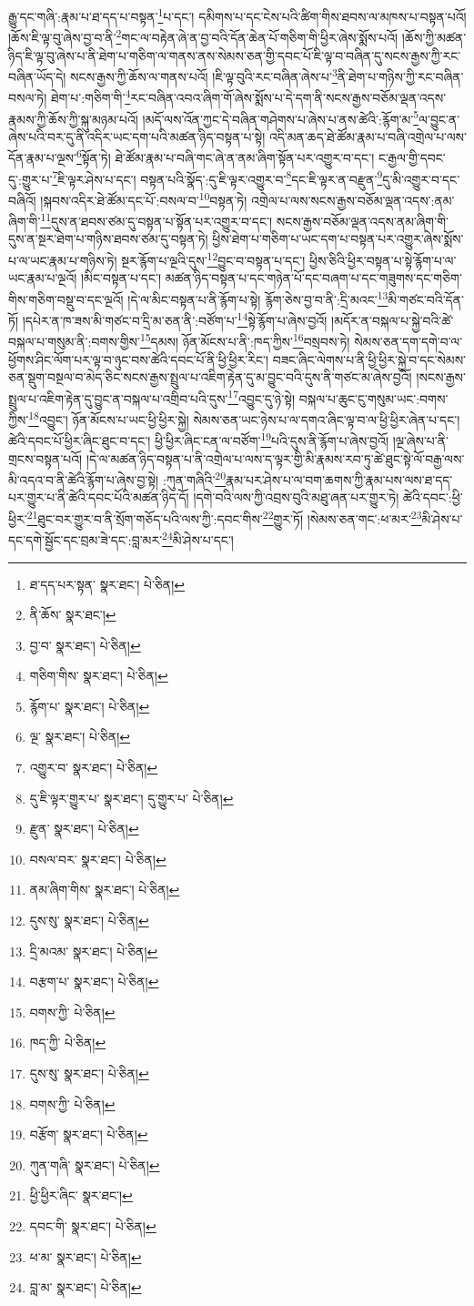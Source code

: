 རྒྱུ་དང་གཞི་:རྣམ་པ་ཐ་དད་པ་བསྟན་\footnote{ཐ་དད་པར་སྟན་  སྣར་ཐང་།  པེ་ཅིན། }པ་དང་། དམིགས་པ་དང་ངེས་པའི་ཚིག་གིས་ཐབས་ལ་མཁས་པ་བསྟན་པའོ། །ཆོས་ཇི་ལྟ་བུ་ཞེས་བྱ་བ་ནི་\footnote{ནི་ཆོས་  སྣར་ཐང་། }གང་ལ་བརྟེན་ཞེ་ན་བྱ་བའི་དོན་ཆེན་པོ་གཅིག་གི་ཕྱིར་ཞེས་སྨོས་པའོ། །ཆོས་ཀྱི་མཚན་ཉིད་ཇི་ལྟ་བུ་ཞེས་པ་ནི་ཐེག་པ་གཅིག་ལ་གནས་ནས་སེམས་ཅན་གྱི་དབང་པོ་ཇི་ལྟ་བ་བཞིན་དུ་སངས་རྒྱས་ཀྱི་རང་བཞིན་ཡོད་དེ། སངས་རྒྱས་ཀྱི་ཆོས་ལ་གནས་པའོ། །ཇི་ལྟ་བུའི་རང་བཞིན་ཞེས་པ་\footnote{བྱ་བ་  སྣར་ཐང་།  པེ་ཅིན། }ནི་ཐེག་པ་གཉིས་ཀྱི་རང་བཞིན་བསལ་ཏེ། ཐེག་པ་:གཅིག་གི་\footnote{གཅིག་གིས་  སྣར་ཐང་།  པེ་ཅིན། }རང་བཞིན་འབའ་ཞིག་གོ་ཞེས་སྨོས་པ་དེ་དག་ནི་སངས་རྒྱས་བཅོམ་ལྡན་འདས་རྣམས་ཀྱི་ཆོས་ཀྱི་སྐུ་མཉམ་པའོ། །མདོ་ལས་འོན་ཀྱང་དེ་བཞིན་གཤེགས་པ་ཞེས་པ་ནས་ཚེའི་:རྙོག་མ་\footnote{རྙོག་པ་  སྣར་ཐང་།  པེ་ཅིན། }ལ་བྱུང་ན་ཞེས་པའི་བར་དུ་ནི་འདིར་ཡང་དག་པའི་མཚན་ཉིད་བསྟན་པ་སྟེ། འདི་མན་ཆད་ཐེ་ཚོམ་རྣམ་པ་བཞི་འགྲེལ་པ་ལས་དོན་རྣམ་པ་ལྔས་\footnote{ལྔ་  སྣར་ཐང་།  པེ་ཅིན། }སྟོན་ཏེ། ཐེ་ཚོམ་རྣམ་པ་བཞི་གང་ཞེ་ན་ནམ་ཞིག་སྟོན་པར་འགྱུར་བ་དང་། ང་རྒྱལ་གྱི་དབང་དུ་:གྱུར་པ་\footnote{འགྱུར་བ་  སྣར་ཐང་།  པེ་ཅིན། }ཇི་ལྟར་ཤེས་པ་དང་། བསྟན་པའི་སྣོད་:དུ་ཇི་ལྟར་འགྱུར་བ་\footnote{དུ་ཇི་ལྟར་གྱུར་པ་  སྣར་ཐང་། དུ་གྱུར་པ་  པེ་ཅིན། }དང་ཇི་ལྟར་ན་བརྫུན་\footnote{རྫུན་  སྣར་ཐང་།  པེ་ཅིན། }དུ་མི་འགྱུར་བ་དང་བཞིའོ། །སྐབས་འདིར་ཐེ་ཚོམ་དང་པོ་:བསལ་བ་\footnote{བསལ་བར་  སྣར་ཐང་།  པེ་ཅིན། }བསྟན་ཏེ། འགྲེལ་པ་ལས་སངས་རྒྱས་བཅོམ་ལྡན་འདས་:ནམ་ཞིག་གི་\footnote{ནམ་ཞིག་གིས་  སྣར་ཐང་།  པེ་ཅིན། }དུས་ན་ཐབས་ཙམ་དུ་བསྟན་པ་སྟོན་པར་འགྱུར་བ་དང་། སངས་རྒྱས་བཅོམ་ལྡན་འདས་ནམ་ཞིག་གི་དུས་ན་སྔར་ཐེག་པ་གཉིས་ཐབས་ཙམ་དུ་བསྟན་ཏེ། ཕྱིས་ཐེག་པ་གཅིག་པ་ཡང་དག་པ་བསྟན་པར་འགྱུར་ཞེས་སྨོས་པ་ལ་ཡང་རྣམ་པ་གཉིས་ཏེ། སྔར་རྙོག་པ་ལྔའི་དུས་\footnote{དུས་སུ་  སྣར་ཐང་།  པེ་ཅིན། }བྱུང་བ་བསྟན་པ་དང་། ཕྱིས་ཅིའི་ཕྱིར་བསྟན་པ་སྟེ་རྙོག་པ་ལ་ཡང་རྣམ་པ་ལྔའོ། །མིང་བསྟན་པ་དང་། མཚན་ཉིད་བསྟན་པ་དང་གཉེན་པོ་དང་བཞག་པ་དང་གཟུགས་དང་གཅིག་གིས་གཅིག་བསྡུ་བ་དང་ལྔའོ། །དེ་ལ་མིང་བསྟན་པ་ནི་རྙོག་པ་སྟེ། རྙོག་ཅེས་བྱ་བ་ནི་:དྲི་མའང་\footnote{དྲི་མའམ་  སྣར་ཐང་།  པེ་ཅིན། }མི་གཙང་བའི་དོན་ཏོ། །དཔེར་ན་ཁ་ཟས་མི་གཙང་བ་དྲི་མ་ཅན་ནི་:བཙོག་པ་\footnote{བརྩག་པ་  སྣར་ཐང་།  པེ་ཅིན། }སྟེ་རྙོག་པ་ཞེས་བྱའོ། །མདོར་ན་བསྐལ་པ་སྐྱེ་བའི་ཚེ་བསྐལ་པ་གསུམ་ནི་:བགས་གྱིས་\footnote{བགས་ཀྱི་  པེ་ཅིན། }དམས། ཉོན་མོངས་པ་ནི་:ཁད་ཀྱིས་\footnote{ཁད་ཀྱི་  པེ་ཅིན། }བསྲབས་ཏེ། སེམས་ཅན་དག་དགེ་བ་ལ་ཕྱོགས་ཤིང་ལོག་པར་ལྟ་བ་ཉུང་བས་ཚེའི་དབང་པོ་ནི་ཕྱི་ཕྱིར་རིང་། བཟང་ཞིང་ལེགས་པ་ནི་ཕྱི་ཕྱིར་སྐྱེ་བ་དང་སེམས་ཅན་སྡུག་བསྔལ་བ་མེད་ཅིང་སངས་རྒྱས་སྤྲུལ་པ་འཇིག་རྟེན་དུ་མ་བྱུང་བའི་དུས་ནི་གཙང་མ་ཞེས་བྱའོ། །སངས་རྒྱས་སྤྲུལ་པ་འཇིག་རྟེན་དུ་བྱུང་ན་བསྐལ་པ་འགྲིབ་པའི་དུས་\footnote{དུས་སུ་  སྣར་ཐང་།  པེ་ཅིན། }འབྱུང་དུ་ཉེ་སྟེ། བསྐལ་པ་ཆུང་ངུ་གསུམ་ཡང་:བགས་ཀྱིས་\footnote{བགས་ཀྱི་  པེ་ཅིན། }འབྱུང་། ཉོན་མོངས་པ་ཡང་ཕྱི་ཕྱིར་སྐྱེ། སེམས་ཅན་ཡང་ཉེས་པ་ལ་དགའ་ཞིང་ལྟ་བ་ལ་ཕྱི་ཕྱིར་ཞེན་པ་དང་། ཚེའི་དབང་པོ་ཕྱིར་ཞིང་ཐུང་བ་དང་། ཕྱི་ཕྱིར་ཞིང་ངན་ལ་བཙོག་\footnote{བརྩོག་  སྣར་ཐང་།  པེ་ཅིན། }པའི་དུས་ནི་རྙོག་པ་ཞེས་བྱའོ། །ལྔ་ཞེས་པ་ནི་གྲངས་བསྟན་པའོ། །དེ་ལ་མཚན་ཉིད་བསྟན་པ་ནི་འགྲེལ་པ་ལས་ད་ལྟར་གྱི་མི་རྣམས་རབ་ཏུ་ཚེ་ཐུང་སྟེ་ལོ་བརྒྱ་ལས་མི་འདའ་བ་ནི་ཚེའི་རྙོག་པ་ཞེས་བྱ་སྟེ། :ཀུན་གཞིའི་\footnote{ཀུན་གཞི་  སྣར་ཐང་།  པེ་ཅིན། }རྣམ་པར་ཤེས་པ་ལ་བག་ཆགས་ཀྱི་རྣམ་པས་ལས་ཐ་དད་པར་གྱུར་པ་ནི་ཚེའི་དབང་པོའི་མཚན་ཉིད་དོ། །དགེ་བའི་ལས་ཀྱི་འབྲས་བུའི་མཐུ་ཞན་པར་གྱུར་ཏེ། ཚེའི་དབང་:ཕྱི་ཕྱིར་\footnote{ཕྱི་ཕྱིར་ཞིང་  སྣར་ཐང་། }ཐུང་བར་གྱུར་བ་ནི་སྲོག་གཅོད་པའི་ལས་ཀྱི་:དབང་གིས་\footnote{དབང་གི་  སྣར་ཐང་།  པེ་ཅིན། }གྱུར་ཏོ། །སེམས་ཅན་གང་:ཕ་མར་\footnote{ཕ་མ་  སྣར་ཐང་།  པེ་ཅིན། }མི་ཤེས་པ་དང་དགེ་སྦྱོང་དང་བྲམ་ཟེ་དང་:བླ་མར་\footnote{བླ་མ་  སྣར་ཐང་།  པེ་ཅིན། }མི་ཤེས་པ་དང་། 